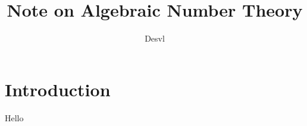 \documentclass[
	fontsize=10pt, %
	twoside=false, %
	secnumdepth=1, %
]{kaobook}
\title{Note on Algebraic Number Theory}
\author{Desvl}
\begin{document}
	\maketitle
	\tableofcontents
	
	\section{Introduction}
	Hello
\end{document}
